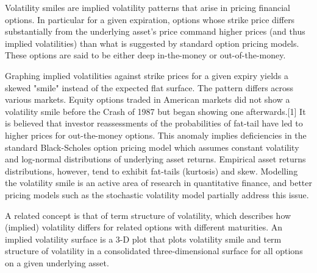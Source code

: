 Volatility smiles are implied volatility patterns that arise in pricing financial options. In particular for a given expiration, options whose strike price differs substantially from the underlying asset's price command higher prices (and thus implied volatilities) than what is suggested by standard option pricing models. These options are said to be either deep in-the-money or out-of-the-money.

Graphing implied volatilities against strike prices for a given expiry yields a skewed "smile" instead of the expected flat surface. The pattern differs across various markets. Equity options traded in American markets did not show a volatility smile before the Crash of 1987 but began showing one afterwards.[1] It is believed that investor reassessments of the probabilities of fat-tail have led to higher prices for out-the-money options. This anomaly implies deficiencies in the standard Black-Scholes option pricing model which assumes constant volatility and log-normal distributions of underlying asset returns. Empirical asset returns distributions, however, tend to exhibit fat-tails (kurtosis) and skew. Modelling the volatility smile is an active area of research in quantitative finance, and better pricing models such as the stochastic volatility model partially address this issue.

A related concept is that of term structure of volatility, which describes how (implied) volatility differs for related options with different maturities. An implied volatility surface is a 3-D plot that plots volatility smile and term structure of volatility in a consolidated three-dimensional surface for all options on a given underlying asset.
